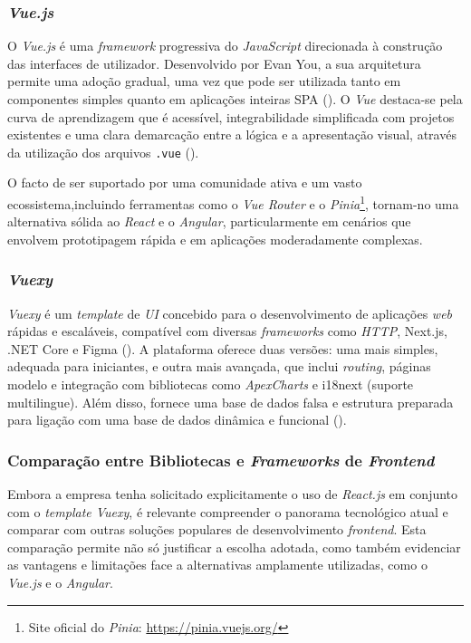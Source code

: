 \subsubsection{\textit{Vue.js}}

O \textit{Vue.js} é uma \textit{framework} progressiva do \textit{JavaScript} direcionada à construção das interfaces de utilizador. Desenvolvido por Evan You, a sua arquitetura  permite uma adoção gradual, uma vez que pode ser utilizada tanto em componentes simples quanto em aplicações inteiras \gls{SPA} (\cite{VueDocs2025}). O \textit{Vue} destaca-se pela curva de aprendizagem que é acessível, integrabilidade simplificada com projetos existentes e uma clara demarcação entre a lógica e a apresentação visual, através da utilização dos arquivos \texttt{.vue} (\cite{VueMastery2023}).

O facto de ser suportado por uma comunidade ativa e um vasto ecossistema,incluindo ferramentas como o \textit{Vue Router} e o \textit{Pinia}\footnote{Site oficial do \textit{Pinia}: \url{https://pinia.vuejs.org/}}, tornam-no uma alternativa sólida ao \textit{React} e o \textit{Angular}, particularmente em cenários que envolvem prototipagem rápida e em aplicações moderadamente complexas.

\subsubsection{\textit{Vuexy}}

\textit{Vuexy} é um \textit{template} de \textit{\gls{UI}} concebido para o desenvolvimento de aplicações \textit{web} rápidas e escaláveis, compatível com diversas \textit{frameworks} como \textit{\gls{HTTP}}, Next.js, .NET Core e Figma (\cite{PixInvent2025}). A plataforma oferece duas versões: uma mais simples, adequada para iniciantes, e outra mais avançada, que inclui \textit{routing}, páginas modelo e integração com bibliotecas como \textit{ApexCharts} e i18next (suporte multilingue). Além disso, fornece uma base de dados falsa e estrutura preparada para ligação com uma base de dados dinâmica e funcional (\cite{Vuexy2025}).

\subsubsection{Comparação entre Bibliotecas e \textit{Frameworks} de \textit{Frontend}}

Embora a empresa tenha solicitado explicitamente o uso de \textit{React.js} em conjunto com o \textit{template Vuexy}, é relevante compreender o panorama tecnológico atual e comparar com outras soluções populares de desenvolvimento \textit{frontend}. Esta comparação permite não só justificar a escolha adotada, como também evidenciar as vantagens e limitações face a alternativas amplamente utilizadas, como o \textit{Vue.js} e o \textit{Angular}.


